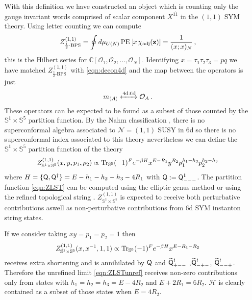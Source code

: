 \documentclass[main.tex]{subfiles}
\begin{document}
With this definition we have constructed an object which is counting only the gauge invariant words comprised of scalar component $X^{1\dot1}$ in the $(1,1)$ SYM theory. Using letter counting we can compute
\begin{equation}
Z^{(1,1)}_{\text{$\frac{1}{2}$-BPS}}=\oint d\mu_{U(N)}\operatorname{\mathrm{PE}}\left[x\,\chi_{\text{adj}}(\mathbf{z})\right]=\frac{1}{(x;x)_N}\,,
\end{equation}
this is the Hilbert series for $\mathbb{C}[\mathcal{O}_1,\mathcal{O}_2,\dots,\mathcal{O}_N]$. Identifying $x=\tau_1\tau_2\tau_3=pq$ we have matched $Z^{(1,1)}_{\text{$\frac{1}{2}$-BPS}}$ with \eqref{eqn:decon4d} and the map between the operators is just
\begin{equation}
m_{(A)}\xleftrightarrow[]{\text{4d:6d}}\mathcal{O}_A\,.
\end{equation}
These operators can be expected to be found as a subset of those counted by the $\mathbb{S}^1\times \mathbb{S}^5$ partition function. By the Nahm classification \cite{Nahm:1977tg}, there is no superconformal algebra associated to $\mathcal{N}=(1,1)$ SUSY in 6d so there is no superconformal index associated to this theory nevertheless we can define the $\mathbb{S}^1\times \mathbb{S}^5$ partition function of the theory
\begin{equation}\label{eqn:ZLST}
Z^{(1,1)}_{\mathbb{S}^1\times \mathbb{S}^5}(x,y,p_1,p_2)\propto\operatorname{Tr}_{\mathbb{S}^5}(-1)^Fe^{-\beta H}x^{E-R_1}y^{R_2}p_1^{h_1-h_3}p_2^{h_2-h_3}
\end{equation}
where $H=\{\mathsf{Q},\mathsf{Q}^{\dagger}\}=E-h_1-h_2-h_3-4R_1$ with $\mathsf{Q}:=\mathsf{Q}_{---}^{1}$. The partition function \eqref{eqn:ZLST} can be computed using the elliptic genus method \cite{Kim:2015gha,Kim:2017xan,Kim:2018gak} or using the refined topological string \cite{Iqbal:2007ii,Lockhart:2012vp}. $Z^{(1,1)}_{\mathbb{S}^1\times \mathbb{S}^5}$ is expected to receive both perturbative contributions aswell as non-perturbative contributions from 6d SYM instanton string states.

If we consider taking $xy=p_1=p_2=1$ then
\begin{equation}\label{eqn:ZLSTunref}
Z^{(1,1)}_{\mathbb{S}^1\times \mathbb{S}^5}(x,x^{-1},1,1)\propto\operatorname{Tr}_{\mathbb{S}^5}(-1)^Fe^{-\beta H}x^{E-R_1-R_2}
\end{equation}
receives extra shortening and is annihilated by $\mathsf{Q}$ and $\widetilde{\mathsf{Q}}_{+--}^{\dot1}$ ,$\widetilde{\mathsf{Q}}_{-+-}^{\dot1}$, $\widetilde{\mathsf{Q}}_{--+}^{\dot1}$. Therefore the unrefined limit \eqref{eqn:ZLSTunref} receives non-zero contributions only from states with $h_1=h_2=h_3=E-4R_2$ and $E+2R_1=6R_2$. $\mathcal{H}$ is clearly contained as a subset of those states when $E=4R_2$. 
\end{document}
